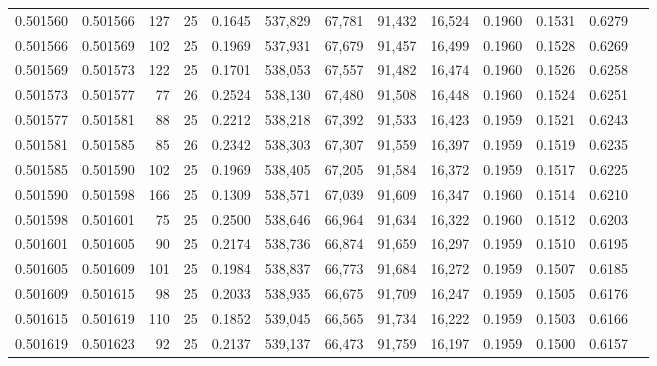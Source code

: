 \begin{tabular}{rrrrrrrrrrrrr}
0.501560 & 0.501566 & 127 &  25 &                                     0.1645 & 537,829 &  67,781 &  91,432 &  16,524 & 0.1960 & 0.1531 & 0.6279 \\
0.501566 & 0.501569 & 102 &  25 &                                     0.1969 & 537,931 &  67,679 &  91,457 &  16,499 & 0.1960 & 0.1528 & 0.6269 \\
0.501569 & 0.501573 & 122 &  25 &                                     0.1701 & 538,053 &  67,557 &  91,482 &  16,474 & 0.1960 & 0.1526 & 0.6258 \\
0.501573 & 0.501577 &  77 &  26 &                                     0.2524 & 538,130 &  67,480 &  91,508 &  16,448 & 0.1960 & 0.1524 & 0.6251 \\
0.501577 & 0.501581 &  88 &  25 &                                     0.2212 & 538,218 &  67,392 &  91,533 &  16,423 & 0.1959 & 0.1521 & 0.6243 \\
0.501581 & 0.501585 &  85 &  26 &                                     0.2342 & 538,303 &  67,307 &  91,559 &  16,397 & 0.1959 & 0.1519 & 0.6235 \\
0.501585 & 0.501590 & 102 &  25 &                                     0.1969 & 538,405 &  67,205 &  91,584 &  16,372 & 0.1959 & 0.1517 & 0.6225 \\
0.501590 & 0.501598 & 166 &  25 &                                     0.1309 & 538,571 &  67,039 &  91,609 &  16,347 & 0.1960 & 0.1514 & 0.6210 \\
0.501598 & 0.501601 &  75 &  25 &                                     0.2500 & 538,646 &  66,964 &  91,634 &  16,322 & 0.1960 & 0.1512 & 0.6203 \\
0.501601 & 0.501605 &  90 &  25 &                                     0.2174 & 538,736 &  66,874 &  91,659 &  16,297 & 0.1959 & 0.1510 & 0.6195 \\
0.501605 & 0.501609 & 101 &  25 &                                     0.1984 & 538,837 &  66,773 &  91,684 &  16,272 & 0.1959 & 0.1507 & 0.6185 \\
0.501609 & 0.501615 &  98 &  25 &                                     0.2033 & 538,935 &  66,675 &  91,709 &  16,247 & 0.1959 & 0.1505 & 0.6176 \\
0.501615 & 0.501619 & 110 &  25 &                                     0.1852 & 539,045 &  66,565 &  91,734 &  16,222 & 0.1959 & 0.1503 & 0.6166 \\
0.501619 & 0.501623 &  92 &  25 &                                     0.2137 & 539,137 &  66,473 &  91,759 &  16,197 & 0.1959 & 0.1500 & 0.6157 \\

\end{tabular}
